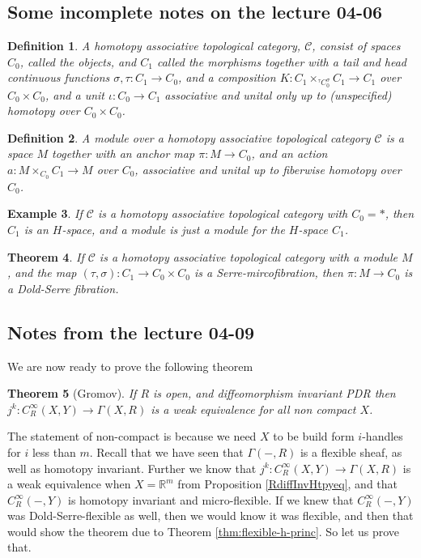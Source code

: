 \documentclass{article}
\newtheorem{theorem}{Theorem}[section]
\newtheorem{definition}[theorem]{Definition}
\newtheorem{example}[theorem]{Example}
\newtheorem{proposed work}[theorem]{Proposed Work}
\begin{document}
\subsection{Some incomplete notes on the lecture 04-06}
\begin{definition}\label{HtpAssTopCat}
A homotopy associative topological category, $\mathcal{C}$, consist of spaces $C_0$, called the objects, and $C_1$ called the morphisms together with a tail and head continuous functions $\sigma, \tau : C_1\to C_0$, and a composition $K: C_1 \times_{{}^\tau C_0^\sigma} C_1\to C_1$ over $C_0\times C_0$, and a unit $\iota: C_0\to C_1$ associative and unital only up to (unspecified) homotopy over $C_0\times C_0$. 
\end{definition}

\begin{definition}
A module over a homotopy associative topological category $\mathcal{C}$ is a space $M$ together with an anchor map $\pi: M\to C_0$, and an action $a: M\times_{C_0} C_1 \to M$ over $C_0$, associative and unital up to fiberwise homotopy over $C_0$.
\end{definition}

\begin{example}
If $\mathcal{C}$ is a homotopy associative topological category with $C_0=*$, then $C_1$ is an $H$-space, and a module is just a module for the $H$-space $C_1$. 
\end{example}

\begin{theorem}\label{Fib&HATCat}
If $\mathcal{C}$ is a homotopy associative topological category with a module $M$, and the map $(\tau, \sigma): C_1\to C_0 \times C_0$ is a Serre-mircofibration, then $\pi :M\to C_0$ is a Dold-Serre fibration.
\end{theorem}

\subsection{Notes from the lecture 04-09}
We are now ready to prove the following theorem
\begin{theorem}[Gromov]\label{thm:Gromov} If $R$ is open, and diffeomorphism invariant PDR then $j^k: C_R^\infty(X,Y)\to \Gamma(X, R)$ is a weak equivalence for all non compact $X$.
\end{theorem}
The statement of non-compact is because we need $X$ to be build form $i$-handles for $i$ less than $m$. Recall that we have seen that $\Gamma(-,R)$ is a flexible sheaf, as well as homotopy invariant. Further we know that $j^k: C_R^\infty(X,Y)\to \Gamma(X, R)$ is a weak equivalence when $X=\mathbb{R}^m$ from Proposition \ref{RdiffInvHtpyeq}, and that $C^\infty_R(-,Y)$ is homotopy invariant and micro-flexible. If we knew that $C^\infty_R(-,Y)$ was Dold-Serre-flexible as well, then we would know it was flexible, and then that would show the theorem due to Theorem \ref{thm:flexible-h-princ}. So let us prove that.
\end{document}
